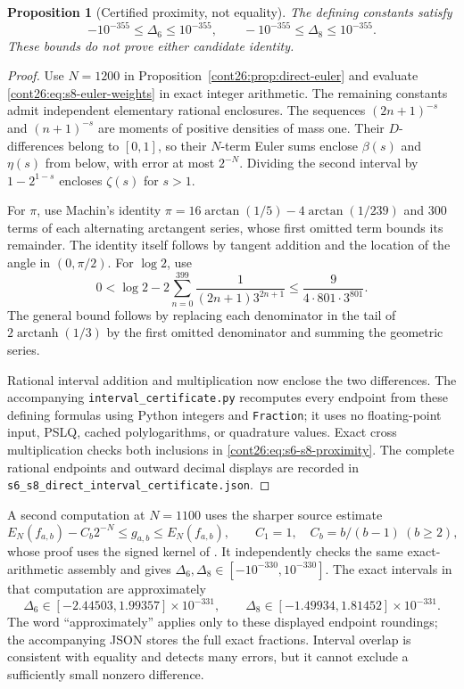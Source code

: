 \documentclass[11pt,letterpaper]{article}
\numberwithin{equation}{section}
\theoremstyle{plain}
\newtheorem{proposition}[theorem]{Proposition}
\theoremstyle{definition}
\theoremstyle{remark}
\begin{document}
\begin{proposition}[Certified proximity, not equality]
\label{cont26:prop:s6-s8-proximity}
The defining constants satisfy
\begin{equation}\label{cont26:eq:s6-s8-proximity}
 -10^{-355}\leq\Delta_6\leq10^{-355},\qquad
 -10^{-355}\leq\Delta_8\leq10^{-355}.
\end{equation}
These bounds do not prove either candidate identity.
\end{proposition}

\begin{proof}
Use $N=1200$ in Proposition~\ref{cont26:prop:direct-euler} and evaluate
\eqref{cont26:eq:s8-euler-weights} in exact integer arithmetic.
The remaining constants admit independent elementary rational
enclosures. The sequences $(2n+1)^{-s}$ and $(n+1)^{-s}$ are moments
of positive densities of mass one. Their $D$-differences belong to
$[0,1]$, so their $N$-term Euler sums enclose $\beta(s)$ and
$\eta(s)$ from below, with error at most $2^{-N}$. Dividing the
second interval by $1-2^{1-s}$ encloses $\zeta(s)$ for $s>1$.

For $\pi$, use Machin's identity
$\pi=16\arctan(1/5)-4\arctan(1/239)$ and $300$ terms of each
alternating arctangent series, whose first omitted term bounds its
remainder. The identity itself follows by tangent addition and the
location of the angle in $(0,\pi/2)$. For $\log2$, use
\[
 0<\log2-2\sum_{n=0}^{399}\frac1{(2n+1)3^{2n+1}}
 \leq\frac9{4\cdot801\cdot3^{801}}.
\]
The general bound follows by replacing each denominator in the tail
of $2\operatorname{arctanh}(1/3)$ by the first omitted denominator
and summing the geometric series.

Rational interval addition and multiplication now enclose the two
differences. The accompanying
\nolinkurl{interval_certificate.py} recomputes every endpoint from
these defining formulas using Python integers and \texttt{Fraction};
it uses no floating-point input, PSLQ, cached polylogarithms, or
quadrature values. Exact cross multiplication checks both inclusions
in \eqref{cont26:eq:s6-s8-proximity}. The complete rational endpoints and
outward decimal displays are recorded in
\nolinkurl{s6_s8_direct_interval_certificate.json}.
\end{proof}

A second computation at $N=1100$ uses the sharper source estimate
\[
 E_N(f_{a,b})-C_b2^{-N}\leq g_{a,b}\leq E_N(f_{a,b}),
 \qquad C_1=1,\quad C_b=b/(b-1)\ (b\geq2),
\]
whose proof uses the signed kernel of \cite{ProveIt}. It independently
checks the same exact-arithmetic assembly and gives
$\Delta_6,\Delta_8\in[-10^{-330},10^{-330}]$.
The exact intervals in that computation are approximately
\[
 \Delta_6\in[-2.44503,1.99357]\times10^{-331},\qquad
 \Delta_8\in[-1.49934,1.81452]\times10^{-331}.
\]
The word ``approximately'' applies only to these displayed endpoint
roundings; the accompanying JSON stores the full exact fractions.
Interval overlap is consistent with equality and detects many errors,
but it cannot exclude a sufficiently small nonzero difference.
\end{document}
